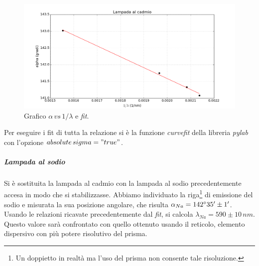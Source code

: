 \documentclass[10pt,a4paper]{article}
\begin{document}
\begin{figure}[!htb]
  \centering
  \includegraphics[scale=0.6]{imm.png}
\caption{Grafico $\alpha\, \textit{vs}\, 1/\lambda$ e \emph{fit}.}
\label{pin}
\end{figure}

Per eseguire i fit di tutta la relazione si è la funzione \emph{curvefit} della libreria \emph{pylab} con l'opzione \emph{$absolute\,sigma = "true"$}.\\

\subparagraph{Lampada al sodio}
Si è sostituita la lampada al cadmio con la lampada al sodio precedentemente accesa in modo che si stabilizzasse. Abbiamo individuato la riga\footnote{Un doppietto in realtà ma l'uso del prisma non consente tale risoluzione.} di emissione del sodio e misurata la sua posizione angolare, che risulta $\alpha_{Na}=142 \degree 35'\pm 1'$. Usando le relazioni ricavate precedentemente dal \emph{fit}, si calcola $\lambda_{Na}=590 \pm 10 \,nm$. Questo valore sarà confrontato con quello ottenuto usando il reticolo, elemento dispersivo con più potere risolutivo del prisma.
\end{document}
